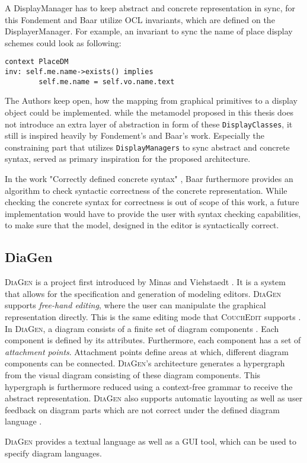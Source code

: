 A DisplayManager has to keep abstract and concrete representation in sync, for this Fondement and Baar utilize OCL invariants, which are defined on the DisplayerManager. For example, an invariant to sync the name of place display schemes could look as following:

\begin{lstlisting}[language=OCL,captionpos=b,caption={OCL Invariant that syncs the name attribute of \texttt{DisplayClass} and model element.}]
context PlaceDM
inv: self.me.name->exists() implies
        self.me.name = self.vo.name.text
\end{lstlisting}

The Authors keep open, how the mapping from graphical primitives to a display object could be implemented. while the metamodel proposed in this thesis does not introduce an extra layer of abstraction in form of these \texttt{DisplayClasses}, it still is inspired heavily by Fondement's and Baar's work. Especially the constraining part that utilizes \texttt{DisplayManagers} to sync abstract and concrete syntax, served as primary inspiration for the proposed architecture.

In the work "Correctly defined concrete syntax" \cite{baar_correctly_2008}, Baar furthermore provides an algorithm to check syntactic correctness of the concrete representation. While checking the concrete syntax for correctness is out of scope of this work, a future implementation would have to provide the user with syntax checking capabilities, to make sure that the model, designed in the editor is syntactically correct.


\subsection{DiaGen}
\label{diagen}
\textsc{DiaGen} is a project first introduced by Minas and Viehstaedt \cite{minas_diagen_1995}. It is a system that allows for the specification and generation of modeling editors. \textsc{DiaGen} supports \emph{free-hand editing}, where the user can manipulate the graphical representation directly. This is the same editing mode that \textsc{CouchEdit} supports \cite{nachreiner_couchedit_2020}. In \textsc{DiaGen}, a diagram consists of a finite set of diagram components \cite{minas_concepts_2002}. Each component is defined by its attributes. Furthermore, each component has a set of \emph{attachment points}. Attachment points define areas at which, different diagram components can be connected. \textsc{DiaGen}'s architecture generates a hypergraph from the visual diagram consisting of these diagram components. This hypergraph is furthermore reduced using a context-free grammar to receive the abstract representation. \textsc{DiaGen} also supports automatic layouting as well as user feedback on diagram parts which are not correct under the defined diagram language \cite{minas_concepts_2002}.

\textsc{DiaGen} provides a textual language as well as a GUI tool, which can be used to specify diagram languages. 


